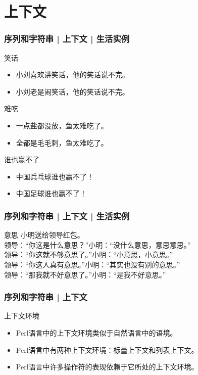 \section{上下文}
\begin{frame}
  \frametitle{序列和字符串 | 上下文 | 生活实例}
  \begin{block}{笑话}
    \begin{itemize}
      \item 小刘喜欢讲笑话，他的笑话说不完。
      \item 小刘老是闹笑话，他的笑话说不完。
    \end{itemize}
  \end{block}
  \pause
  \begin{block}{难吃}
    \begin{itemize}
      \item 一点盐都没放，鱼太难吃了。
      \item 全都是毛毛刺，鱼太难吃了。
    \end{itemize}
  \end{block}
  \pause
  \begin{block}{谁也赢不了}
    \begin{itemize}
      \item 中国兵乓球谁也赢不了！
      \item 中国足球谁也赢不了！
    \end{itemize}
  \end{block}
\end{frame}

\begin{frame}
  \frametitle{序列和字符串 | 上下文 | 生活实例}
  \begin{block}{意思}
小明送给领导红包。\\
领导：“你这是什么意思？”\qquad 小明：“没什么意思，意思意思。”\\
领导：“你这就不够意思了。”\quad 小明：“小意思，小意思。”\\
领导：“你这人真有意思。”\qquad 小明：“其实也没有别的意思。”\\
领导：“那我就不好意思了。”\quad 小明：“是我不好意思。”
  \end{block}
\end{frame}

\begin{frame}
  \frametitle{序列和字符串 | 上下文}
  \begin{block}{上下文环境}
    \begin{itemize}
      \item Perl语言中的上下文环境类似于自然语言中的语境。
      \item Perl语言中有两种上下文环境：标量上下文和列表上下文。
      \item Perl语言中许多操作符的表现依赖于它所处的上下文环境。
    \end{itemize}
  \end{block}
\end{frame}

